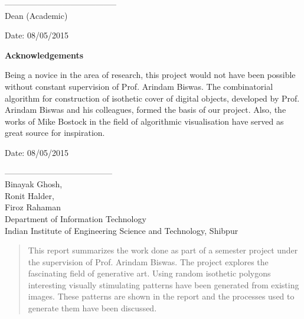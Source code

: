 \documentclass[12pt]{article}
\begin{document}
\begin{minipage}[t]{0.48\linewidth}
-----------------------------------------\\
Dean (Academic)
\end{minipage}\hfill
\begin{minipage}[t]{0.48\linewidth}
\begin{center}
Date: 08/05/2015
\end{center}
\end{minipage}




\newpage




\thispagestyle{empty}
\begin{center}
  \Huge \textbf{Acknowledgements}
\end{center}
\vspace{2cm}
Being a novice in the area of research, this project would not have been possible without constant
supervision of Prof. Arindam Biswas. The combinatorial algorithm for construction of isothetic cover of digital objects, developed by Prof. Arindam Biswas and his colleagues, formed the basis of our project. Also, the works of Mike Bostock in the field of algorithmic visualisation have served as great source for inspiration.\\
\vspace{2.5cm}

\begin{minipage}[t]{0.48\linewidth}
\begin{flushleft}
Date: 08/05/2015
\end{flushleft}
\end{minipage}\hfill
\begin{minipage}[t]{0.48\linewidth}
\begin{flushright}
---------------------------------------\\
Binayak Ghosh,\\
Ronit Halder,\\
Firoz Rahaman\\
Department of Information Technology\\
Indian Institute of Engineering Science and Technology, Shibpur
\end{flushright}
\end{minipage}




\newpage




\begin{abstract}
This report summarizes the work done as part of a semester project under the supervision of Prof. Arindam Biswas. The project explores the fascinating field of generative art. Using random isothetic polygons interesting visually stimulating patterns have been generated from existing images. These patterns are shown in the report and the processes used to generate them have been discussed.

\end{abstract}
\end{document}
